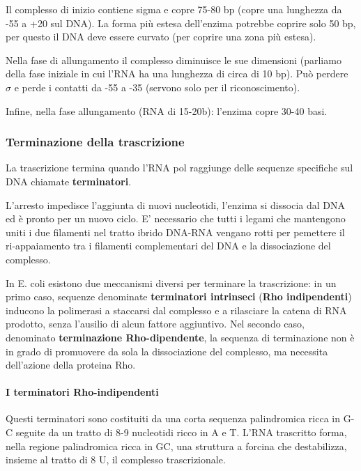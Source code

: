 \documentclass[]{article}
\begin{document}
Il complesso di inizio contiene sigma e copre 75-80 bp (copre una
lunghezza da -55 a +20 sul DNA). La forma più estesa dell'enzima
potrebbe coprire solo 50 bp, per questo il DNA deve essere curvato (per
coprire una zona più estesa).

Nella fase di allungamento il complesso diminuisce le sue dimensioni
(parliamo della fase iniziale in cui l'RNA ha una lunghezza di circa di
10 bp). Può perdere $\sigma$ e perde i contatti da -55 a -35 (servono
solo per il riconoscimento).

Infine, nella fase allungamento (RNA di 15-20b): l'enzima copre 30-40
basi.

\subsubsection{Terminazione della
trascrizione}\label{terminazione-della-trascrizione}

La trascrizione termina quando l'RNA pol raggiunge delle sequenze
specifiche sul DNA chiamate \textbf{terminatori}.

L'arresto impedisce l'aggiunta di nuovi nucleotidi, l'enzima si dissocia
dal DNA ed è pronto per un nuovo ciclo. E' necessario che tutti i legami
che mantengono uniti i due filamenti nel tratto ibrido DNA-RNA vengano
rotti per pemettere il ri-appaiamento tra i filamenti complementari del
DNA e la dissociazione del complesso.

In E. coli esistono due meccanismi diversi per terminare la
trascrizione: in un primo caso, sequenze denominate \textbf{terminatori
intrinseci} (\textbf{Rho indipendenti}) inducono la polimerasi a
staccarsi dal complesso e a rilasciare la catena di RNA prodotto, senza
l'ausilio di alcun fattore aggiuntivo. Nel secondo caso, denominato
\textbf{terminazione Rho-dipendente}, la sequenza di terminazione non è
in grado di promuovere da sola la dissociazione del complesso, ma
necessita dell'azione della proteina Rho.

\paragraph{I terminatori
Rho-indipendenti}\label{i-terminatori-rho-indipendenti}

Questi terminatori sono costituiti da una corta sequenza palindromica
ricca in G-C seguite da un tratto di 8-9 nucleotidi ricco in A e T.
L'RNA trascritto forma, nella regione palindromica ricca in GC, una
struttura a forcina che destabilizza, insieme al tratto di 8 U, il
complesso trascrizionale.
\end{document}
